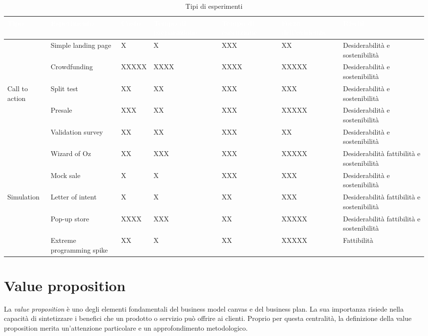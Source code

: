 \begin{table}[ht]
\centering
{}
\footnotesize
\begin{tabular}{|p{2cm}|p{2cm}|p{2cm}|p{2cm}|p{2cm}|p{2cm}|p{2cm}|}
\hline
\rowcolor{headerblue}
\textbf{\textcolor{white}{Tipo}} & \textbf{\textcolor{white}{Esperimento}} & \textbf{\textcolor{white}{Costo}} & \textbf{\textcolor{white}{Tempo di
preparazione}} & \textbf{\textcolor{white}{Tempo di
esecuzione}} & \textbf{\textcolor{white}{Forza dell’evidenza}} & \textbf{\textcolor{white}{Rischi}}\\\hline

& Simple landing page & X & X & XXX & XX & Desiderabilità e sostenibilità\\
& Crowdfunding & XXXXX & XXXX & XXXX & XXXXX & Desiderabilità e sostenibilità\\
Call to action & Split test & XX & XX & XXX & XXX & Desiderabilità e sostenibilità\\
& Presale & XXX & XX & XXX & XXXXX & Desiderabilità e sostenibilità\\
& Validation survey & XX & XX & XXX & XX & Desiderabilità e sostenibilità\\\hline

& Wizard of Oz & XX & XXX & XXX & XXXXX & Desiderabilità fattibilità e sostenibilità\\
& Mock sale & X & X & XXX & XXX & Desiderabilità e sostenibilità\\
Simulation & Letter of intent & X & X & XX & XXX & Desiderabilità fattibilità e sostenibilità\\
& Pop-up store & XXXX & XXX & XX & XXXXX & Desiderabilità fattibilità e sostenibilità\\
& Extreme programming spike & XX & X & XX & XXXXX & Fattibilità\\\hline
\end{tabular}
\caption{Tipi di esperimenti}
\end{table}

\chapter{Value proposition}
La \textit{value proposition} è uno degli elementi fondamentali del business model canvas e del business plan. La sua importanza risiede nella capacità di sintetizzare i benefici che un prodotto o servizio può offrire ai clienti. Proprio per questa centralità, la definizione della value proposition merita un'attenzione particolare e un approfondimento metodologico.

